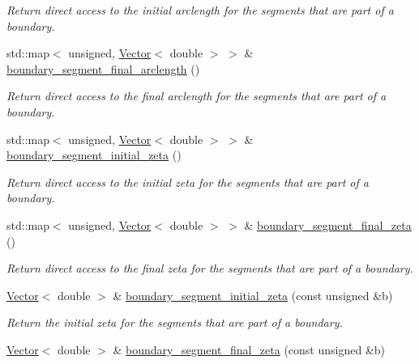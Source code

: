 \begin{DoxyCompactItemize}
\begin{DoxyCompactList}\small\item\em Return direct access to the initial arclength for the segments that are part of a boundary. \end{DoxyCompactList}\item 
std\+::map$<$ unsigned, \hyperlink{classoomph_1_1Vector}{Vector}$<$ double $>$ $>$ \& \hyperlink{classoomph_1_1UnstructuredTwoDMeshGeometryBase_a7008843c35d7b2d31d221157c8963946}{boundary\+\_\+segment\+\_\+final\+\_\+arclength} ()
\begin{DoxyCompactList}\small\item\em Return direct access to the final arclength for the segments that are part of a boundary. \end{DoxyCompactList}\item 
std\+::map$<$ unsigned, \hyperlink{classoomph_1_1Vector}{Vector}$<$ double $>$ $>$ \& \hyperlink{classoomph_1_1UnstructuredTwoDMeshGeometryBase_a437a73c9d0b078c121c254ed2e8cd487}{boundary\+\_\+segment\+\_\+initial\+\_\+zeta} ()
\begin{DoxyCompactList}\small\item\em Return direct access to the initial zeta for the segments that are part of a boundary. \end{DoxyCompactList}\item 
std\+::map$<$ unsigned, \hyperlink{classoomph_1_1Vector}{Vector}$<$ double $>$ $>$ \& \hyperlink{classoomph_1_1UnstructuredTwoDMeshGeometryBase_a0c4ddf7cd3106ffde2b8cbb6528e0d7d}{boundary\+\_\+segment\+\_\+final\+\_\+zeta} ()
\begin{DoxyCompactList}\small\item\em Return direct access to the final zeta for the segments that are part of a boundary. \end{DoxyCompactList}\item 
\hyperlink{classoomph_1_1Vector}{Vector}$<$ double $>$ \& \hyperlink{classoomph_1_1UnstructuredTwoDMeshGeometryBase_affa5cd6a3e3cf61b376cea5ab3d06123}{boundary\+\_\+segment\+\_\+initial\+\_\+zeta} (const unsigned \&b)
\begin{DoxyCompactList}\small\item\em Return the initial zeta for the segments that are part of a boundary. \end{DoxyCompactList}\item 
\hyperlink{classoomph_1_1Vector}{Vector}$<$ double $>$ \& \hyperlink{classoomph_1_1UnstructuredTwoDMeshGeometryBase_a9c5a285a5b12a4b211ceb19e54d3d3d9}{boundary\+\_\+segment\+\_\+final\+\_\+zeta} (const unsigned \&b)

\end{DoxyCompactItemize}
